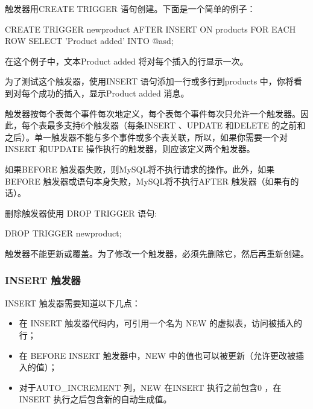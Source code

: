 触发器用CREATE TRIGGER 语句创建。下面是一个简单的例子：
\begin{sql}
CREATE TRIGGER newproduct AFTER INSERT ON products
    FOR EACH ROW SELECT 'Product added' INTO @asd;
\end{sql}

在这个例子中，文本Product added 将对每个插入的行显示一次。


为了测试这个触发器，使用INSERT 语句添加一行或多行到products 中，你将看到对每个成功的插入，显示Product added 消息。

触发器按每个表每个事件每次地定义，每个表每个事件每次只允许一个触发器。因此，每个表最多支持6个触发器（每条INSERT 、UPDATE 和DELETE 的之前和之后）。单一触发器不能与多个事件或多个表关联，所以，如果你需要一个对INSERT 和UPDATE 操作执行的触发器，则应该定义两个触发器。

如果BEFORE 触发器失败，则MySQL将不执行请求的操作。此外，如果BEFORE 触发器或语句本身失败，MySQL将不执行AFTER 触发器（如果有的话）。


删除触发器使用 DROP TRIGGER 语句:

\begin{sql}
DROP TRIGGER newproduct;
\end{sql}

触发器不能更新或覆盖。为了修改一个触发器，必须先删除它，然后再重新创建。

\subsubsection{INSERT 触发器}

INSERT 触发器需要知道以下几点：

\begin{itemize}
    \item 在 INSERT 触发器代码内，可引用一个名为 NEW 的虚拟表，访问被插入的行；
    \item 在 BEFORE INSERT 触发器中，NEW 中的值也可以被更新（允许更改被插入的值）；
    \item 对于AUTO\_INCREMENT 列，NEW 在INSERT 执行之前包含0 ，在INSERT 执行之后包含新的自动生成值。
\end{itemize}

